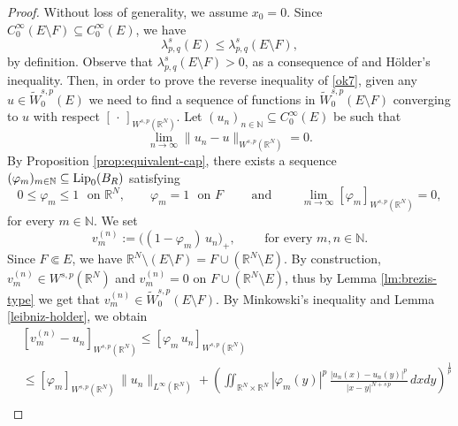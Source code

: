 \documentclass{amsart}
\theoremstyle{definition}
\numberwithin{equation}{section}
\begin{document}
\begin{proof}
	Without loss of generality, we assume $x_0 = 0$. Since $C^\infty_0(E \setminus F) \subseteq C^\infty_0(E)$, we have 
	\begin{equation} \label{ok7}
		\lambda_{p,q}^s(E) \le \lambda_{p,q}^s(E \setminus F),
	\end{equation}
	by definition. Observe that $\lambda_{p, q}^s(E \setminus F) > 0$, as a consequence of \cite[Lemma 2.4]{BLP} and H\"older's inequality. Then, in order to prove the reverse inequality of \eqref{ok7}, given any $u \in \widetilde{W}_0^{s,p}(E)$ we need to find a sequence of functions in $\widetilde{W}^{s,p}_0(E \setminus F)$ converging to $u$ with respect $[\,\cdot\,]_{W^{s,p}(\mathbb{R}^N)}$. Let $(u_n)_{n \in \mathbb{N}} \subseteq C^\infty_0(E)$ be such that  
	\begin{equation} \label{inizio}
		\lim_{n \to \infty} \|u_n - u\|_{W^{s,p}(\mathbb{R}^N)} = 0. 
	\end{equation} 
	By Proposition \ref{prop:equivalent-cap}, there exists a sequence $(\varphi_m)_{m\in \mathbb{N}} \subseteq {\rm Lip}_0(B_R)$ satisfying
	\begin{equation} \label{prop-app-cap}
		0 \le \varphi_m \le 1\,\, \mbox{ on } \mathbb{R}^N, \qquad \varphi_m = 1\,\, \mbox{ on } F \qquad \mbox{ and } \qquad \lim_{m \to \infty} [\varphi_m]_{W^{s,p}(\mathbb{R}^N)} = 0, 
	\end{equation}  
	for every $m \in \mathbb{N}$. We set 
	\begin{equation*}
		v^{(n)}_m := \Big((1-\varphi_m)\,u_n\Big)_{+}, \qquad \mbox{ for every } m, n \in \mathbb{N}.
	\end{equation*}
	Since $F \Subset E$, we have  $\mathbb{R}^N \setminus \left(E \setminus F\right) = F \cup \left(\mathbb{R}^N \setminus E\right)$. By construction, $v^{(n)}_m \in W^{s,p}(\mathbb{R}^N)$ and $v^{(n)}_m = 0$ on $F \cup \left(\mathbb{R}^N \setminus E\right)$, thus by Lemma \ref{lm:brezis-type} we get that  %
	$
	v^{(n)}_m \in \widetilde{W}^{s,p}_0(E \setminus F).
	$
	By Minkowski's inequality and Lemma \ref{leibniz-holder}, we obtain
	\begin{equation*} 
		\begin{split}
			&[v^{(n)}_m - u_n]_{W^{s,p}(\mathbb{R}^N)} \le [\varphi_m\,u_n]_{W^{s,p}(\mathbb{R}^N)} \\ &\le [\varphi_m]_{W^{s,p}(\mathbb{R}^N)}\,\|u_n\|_{L^\infty(\mathbb{R}^N)} + \left(\iint_{\mathbb{R}^N \times \mathbb{R}^N} |\varphi_m(y)|^p\,\frac{|u_n(x) - u_n(y)|^p}{|x-y|^{N+s\,p}}\,dxdy\right)^{\frac{1}{p}} \\

\end{split}
\end{equation*}
\end{proof}
\end{document}
